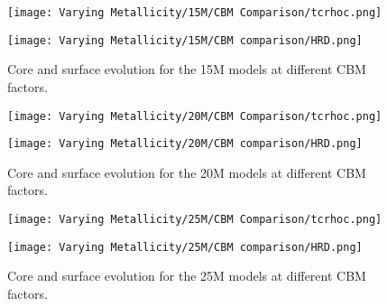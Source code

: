 \begin{figure}[htbp]
    \centering
    \begin{minipage}{0.48\linewidth}
        \centering
        \texttt{[image: Varying Metallicity/15M/CBM Comparison/tcrhoc.png]}
    \end{minipage}%
    \hfill
    \begin{minipage}{0.48\linewidth}
        \centering
        \texttt{[image: Varying Metallicity/15M/CBM comparison/HRD.png]}
    \end{minipage}
    \caption{Core and surface evolution for the 15M models at different CBM factors.}
    \label{fig:15M_CBM_Comparison}
\end{figure}

\begin{figure}[htbp]
    \centering
    \begin{minipage}{0.48\linewidth}
        \centering
        \texttt{[image: Varying Metallicity/20M/CBM Comparison/tcrhoc.png]}
    \end{minipage}%
    \hfill
    \begin{minipage}{0.48\linewidth}
        \centering
        \texttt{[image: Varying Metallicity/20M/CBM comparison/HRD.png]}
    \end{minipage}
    \caption{Core and surface evolution for the 20M models at different CBM factors.}
    \label{fig:20M_CBM_Comparison}
\end{figure}

\begin{figure}[htbp]
    \centering
    \begin{minipage}{0.48\linewidth}
        \centering
        \texttt{[image: Varying Metallicity/25M/CBM Comparison/tcrhoc.png]}
    \end{minipage}%
    \hfill
    \begin{minipage}{0.48\linewidth}
        \centering
        \texttt{[image: Varying Metallicity/25M/CBM comparison/HRD.png]}
    \end{minipage}
    \caption{Core and surface evolution for the 25M models at different CBM factors.}
    \label{fig:25M_CBM_Comparison}
\end{figure}
